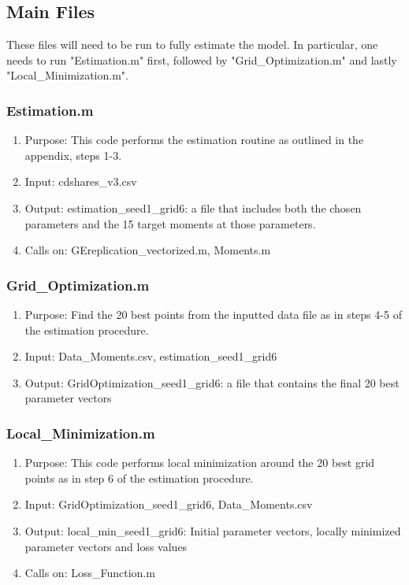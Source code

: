 \documentclass[12pt,a4paper,oneside]{article}
\begin{document}
\newpage

\subsection{Main Files}
These files will need to be run to fully estimate the model. In particular, one needs to run "Estimation.m" first, followed by "Grid\_Optimization.m" and lastly "Local\_Minimization.m".

\subsubsection{Estimation.m}
\begin{enumerate}
\item Purpose: This code performs the estimation routine as outlined in the appendix, steps 1-3.
\item Input: cdshares\_v3.csv
\item Output: estimation\_seed1\_grid6: a file that includes both the chosen parameters and the 15 target moments at those parameters.
\item Calls on: GEreplication\_vectorized.m, Moments.m
\end{enumerate}
\subsubsection{Grid\_Optimization.m}
\begin{enumerate}
\item Purpose: Find the 20 best points from the inputted data file as in steps 4-5 of the estimation procedure.
\item Input: Data\_Moments.csv, estimation\_seed1\_grid6
\item Output: GridOptimization\_seed1\_grid6: a file that contains the final 20 best parameter vectors
\end{enumerate}
\subsubsection{Local\_Minimization.m}
\begin{enumerate}
\item Purpose: This code performs local minimization around the 20 best grid points as in step 6 of the estimation procedure.
\item Input: GridOptimization\_seed1\_grid6, Data\_Moments.csv
\item Output: local_min_seed1_grid6: Initial parameter vectors, locally minimized parameter vectors and loss values
\item Calls on: Loss\_Function.m 
\end{enumerate}
\end{document}
